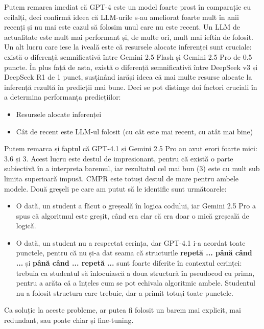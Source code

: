 \documentclass[12pt, a4paper]{report}
\begin{document}
Putem remarca imediat că GPT-4 este un model foarte prost în comparație cu ceilalți, deci confirmă ideea că LLM-urile s-au ameliorat foarte mult în anii recenți  
și nu mai este cazul să folosim unul care nu este recent. Un LLM de actualitate este mult mai performant și, de multe ori, mult mai ieftin de folosit.  
Un alt lucru care iese la iveală este că resursele alocate inferenței sunt cruciale: există o diferență semnificativă între Gemini 2.5 Flash și Gemini 2.5 Pro de 0.5 puncte.  
În plus față de asta, există o diferență semnificativă între DeepSeek v3 și DeepSeek R1 de 1 punct, susținând iarăși ideea că mai multe resurse alocate la inferență rezultă în predicții mai bune.  
Deci se pot distinge doi factori cruciali în a determina performanța predicțiilor:
\begin{itemize}
  \item Resursele alocate inferenței
  \item Cât de recent este LLM-ul folosit (cu cât este mai recent, cu atât mai bine)
\end{itemize}


Putem remarca și faptul că GPT-4.1 și Gemini 2.5 Pro au avut erori foarte mici: 3.6 și 3. Acest lucru este destul de impresionant, pentru că există o parte subiectivă  
în a interpreta baremul, iar rezultatul cel mai bun (3) este cu mult sub limita superioară impusă. CMPR este totuși destul de mare pentru ambele modele.  
Două greșeli pe care am putut să le identific sunt următoarele:
\begin{itemize}
  \item O dată, un student a făcut o greșeală în logica codului, iar Gemini 2.5 Pro a spus că algoritmul este greșit, când era clar că era doar o mică greșeală de logică.
  \item O dată, un student nu a respectat cerința, dar GPT-4.1 i-a acordat toate punctele, pentru că nu și-a dat seama că structurile \textbf{repetă ... până când ...} și \textbf{până când ... repetă ...}  
  sunt foarte diferite în contextul cerinței: trebuia ca studentul să înlocuiască a doua structură în pseudocod cu prima, pentru a arăta că a înțeles cum se pot echivala algoritmic ambele.  
  Studentul nu a folosit structura care trebuie, dar a primit totuși toate punctele.
\end{itemize}

Ca soluție la aceste probleme, ar putea fi folosit un barem mai explicit, mai redundant, sau poate chiar și fine-tuning.
\end{document}
